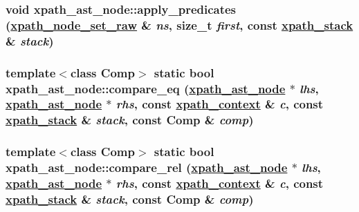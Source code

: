 \hypertarget{classxpath__ast__node_e5e3b5fec836d9478ebd195dda7fdedd}{
\subsubsection[apply\_\-predicates]{\setlength{\rightskip}{0pt plus 5cm}void xpath\_\-ast\_\-node::apply\_\-predicates (\hyperlink{classxpath__node__set__raw}{xpath\_\-node\_\-set\_\-raw} \& {\em ns}, size\_\-t {\em first}, const \hyperlink{structxpath__stack}{xpath\_\-stack} \& {\em stack})}}
\label{classxpath__ast__node_e5e3b5fec836d9478ebd195dda7fdedd}


\hypertarget{classxpath__ast__node_16805022b8f8b8f26061b11d0f8e01b5}{
\subsubsection[compare\_\-eq]{\setlength{\rightskip}{0pt plus 5cm}template$<$class Comp$>$ static bool xpath\_\-ast\_\-node::compare\_\-eq (\hyperlink{classxpath__ast__node}{xpath\_\-ast\_\-node} $\ast$ {\em lhs}, \hyperlink{classxpath__ast__node}{xpath\_\-ast\_\-node} $\ast$ {\em rhs}, const \hyperlink{structxpath__context}{xpath\_\-context} \& {\em c}, const \hyperlink{structxpath__stack}{xpath\_\-stack} \& {\em stack}, const Comp \& {\em comp})}}
\label{classxpath__ast__node_16805022b8f8b8f26061b11d0f8e01b5}


\hypertarget{classxpath__ast__node_055805c7365ac7d99174d2bf7a0cd5e2}{
\subsubsection[compare\_\-rel]{\setlength{\rightskip}{0pt plus 5cm}template$<$class Comp$>$ static bool xpath\_\-ast\_\-node::compare\_\-rel (\hyperlink{classxpath__ast__node}{xpath\_\-ast\_\-node} $\ast$ {\em lhs}, \hyperlink{classxpath__ast__node}{xpath\_\-ast\_\-node} $\ast$ {\em rhs}, const \hyperlink{structxpath__context}{xpath\_\-context} \& {\em c}, const \hyperlink{structxpath__stack}{xpath\_\-stack} \& {\em stack}, const Comp \& {\em comp})}}
\label{classxpath__ast__node_055805c7365ac7d99174d2bf7a0cd5e2}


